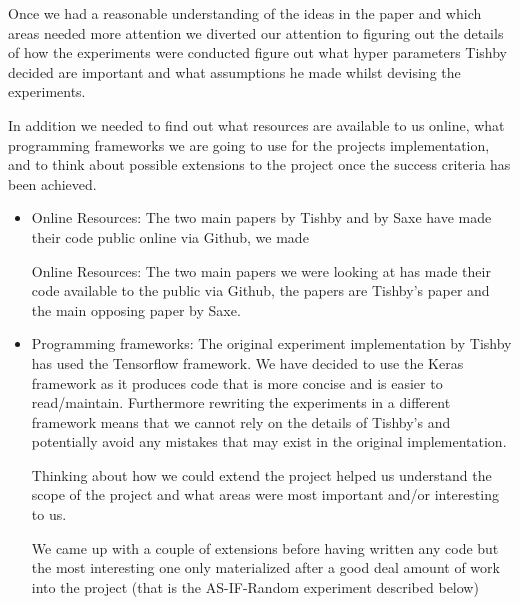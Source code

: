 Once we had a reasonable understanding of the ideas in the paper and which areas
needed more attention we diverted our attention to figuring out the details of
how the experiments were conducted figure out what hyper parameters Tishby
decided are important and what assumptions he made whilst devising the
experiments. 

In addition we needed to find out what resources are available to us online,
what programming frameworks we are going to use for the projects implementation,
and to think about possible extensions to the project once the success criteria
has been achieved.

\begin{itemize}
  \item{
      Online Resources: The two main papers by Tishby and by Saxe have made
      their code public online via Github, we made 

      Online Resources: The two main papers we were looking at has made their
      code available to the public via Github, the papers are Tishby's paper and
      the main opposing paper by Saxe.
    }
  \item{
      Programming frameworks: The original experiment implementation by Tishby
      has used the Tensorflow framework. We have decided to use the Keras
      framework as it produces code that is more concise and is easier to
      read/maintain. Furthermore rewriting the experiments in a different
      framework means that we cannot rely on the details of Tishby's and
      potentially avoid any mistakes that may exist in the original
      implementation.
    }
    \begin{item}

      Thinking about how we could extend the project helped us understand the
      scope of the project and what areas were most important and/or interesting
      to us. 

      We came up with a couple of extensions before having written any code but
      the most interesting one only materialized after a good deal amount of
      work into the project (that is the AS-IF-Random experiment described
      below)


\end{item}
\end{itemize}
